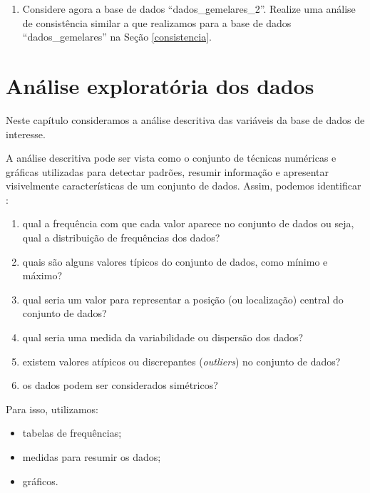 \documentclass[
]{book}
\providecommand{\tightlist}{%
  \setlength{\itemsep}{0pt}\setlength{\parskip}{0pt}}
\begin{document}
\begin{enumerate}
\def\labelenumi{\arabic{enumi}.}
\setcounter{enumi}{5}
\tightlist
\item
  Considere agora a base de dados ``dados\_gemelares\_2''. Realize uma análise de consistência similar a que realizamos para a base de dados ``dados\_gemelares'' na Seção \ref{consistencia}.
\end{enumerate}

\hypertarget{anuxe1lise-exploratuxf3ria-dos-dados}{%
\chapter{Análise exploratória dos dados}\label{anuxe1lise-exploratuxf3ria-dos-dados}}

Neste capítulo consideramos a análise descritiva das variáveis da base de dados de interesse.

A análise descritiva pode ser vista como o conjunto de técnicas numéricas e gráficas utilizadas para detectar padrões, resumir informação e apresentar visivelmente características de um conjunto de dados. Assim, podemos identificar \citep{morettin2020introduccaoa}:

\begin{enumerate}
\def\labelenumi{\roman{enumi})}
\item
  qual a frequência com que cada valor aparece no conjunto de dados ou seja, qual a distribuição de frequências dos
  dados?
\item
  quais são alguns valores típicos do conjunto de dados, como mínimo e máximo?
\item
  qual seria um valor para representar a posição (ou localização) central do conjunto de dados?
\item
  qual seria uma medida da variabilidade ou dispersão dos dados?
\item
  existem valores atípicos ou discrepantes (\emph{outliers}) no conjunto de dados?
\item
  os dados podem ser considerados simétricos?
\end{enumerate}

Para isso, utilizamos:

\begin{itemize}
\tightlist
\item
  tabelas de frequências;
\item
  medidas para resumir os dados;
\item
  gráficos.
\end{itemize}
\end{document}
